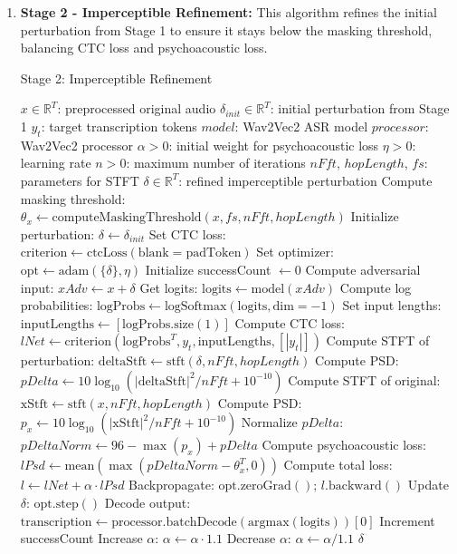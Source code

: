 \documentclass[../main.tex]{subfiles}
\begin{document}
\begin{enumerate}
\item \textbf{Stage 2 - Imperceptible Refinement:} This algorithm refines the initial perturbation from Stage 1 to ensure it stays below the masking threshold, balancing CTC loss and psychoacoustic loss.

\begin{breakablealgorithm}{Stage 2: Imperceptible Refinement}
\begin{algorithmic}[1]
\Require
    \State $x \in \mathbb{R}^{T}$: preprocessed original audio
    \State $\delta_{init} \in \mathbb{R}^{T}$: initial perturbation from Stage 1
    \State $y_t$: target transcription tokens
    \State $model$: Wav2Vec2 ASR model
    \State $processor$: Wav2Vec2 processor
    \State $\alpha > 0$: initial weight for psychoacoustic loss
    \State $\eta > 0$: learning rate
    \State $n > 0$: maximum number of iterations
    \State $nFft$, $hopLength$, $fs$: parameters for STFT
\Ensure $\delta \in \mathbb{R}^{T}$: refined imperceptible perturbation
\State Compute masking threshold: $\theta_x \gets \text{computeMaskingThreshold}(x, fs, nFft, hopLength)$
\State Initialize perturbation: $\delta \gets \delta_{init}$
\State Set CTC loss: $\text{criterion} \gets \text{ctcLoss}(\text{blank}=\text{padToken})$
\State Set optimizer: $\text{opt} \gets \text{adam}(\{\delta\}, \eta)$
\State Initialize successCount $\gets 0$
    \State Compute adversarial input: $xAdv \gets x + \delta$
    \State Get logits: $\text{logits} \gets \text{model}(xAdv)$
    \State Compute log probabilities: $\text{logProbs} \gets \text{logSoftmax}(\text{logits}, \text{dim}=-1)$
    \State Set input lengths: $\text{inputLengths} \gets [\text{logProbs.size}(1)]$
    \State Compute CTC loss: $lNet \gets \text{criterion}(\text{logProbs}^T, y_t, \text{inputLengths}, [|y_t|])$
    \State Compute STFT of perturbation: $\text{deltaStft} \gets \text{stft}(\delta, nFft, hopLength)$
    \State Compute PSD: $pDelta \gets 10 \log_{10}(|\text{deltaStft}|^2 / nFft + 10^{-10})$
    \State Compute STFT of original: $\text{xStft} \gets \text{stft}(x, nFft, hopLength)$
    \State Compute PSD: $p_x \gets 10 \log_{10}(|\text{xStft}|^2 / nFft + 10^{-10})$
    \State Normalize $pDelta$: $pDeltaNorm \gets 96 - \max(p_x) + pDelta$
    \State Compute psychoacoustic loss: $lPsd \gets \text{mean}(\max(pDeltaNorm - \theta_x^T, 0))$
    \State Compute total loss: $l \gets lNet + \alpha \cdot lPsd$
    \State Backpropagate: $\text{opt.zeroGrad}()$; $l.\text{backward}()$
    \State Update $\delta$: $\text{opt.step}()$
    \State Decode output: $\text{transcription} \gets \text{processor.batchDecode}(\text{argmax}(\text{logits}))[0]$
        \State Increment successCount
            \State Increase $\alpha$: $\alpha \gets \alpha \cdot 1.1$
        \EndIf
    \Else
            \State Decrease $\alpha$: $\alpha \gets \alpha / 1.1$
        \EndIf
    \EndIf
\EndFor
\State \Return $\delta$
\end{algorithmic}
\end{breakablealgorithm}

\end{enumerate}
\end{document}
